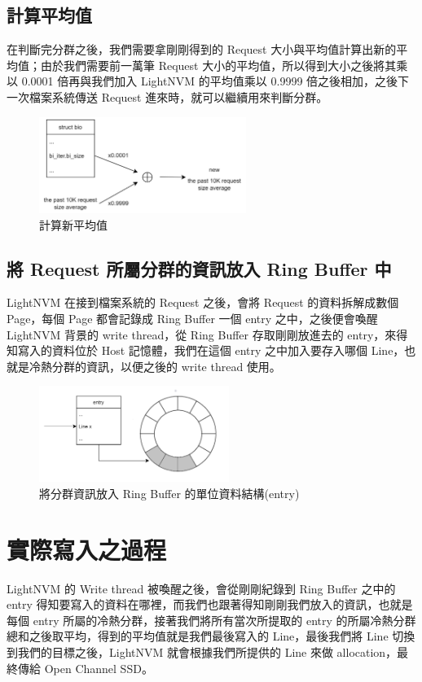 \subsection{計算平均值}\label{s3.2.3}
\indent
在判斷完分群之後，我們需要拿剛剛得到的 Request 大小與平均值計算出新的平均值；由於我們需要前一萬筆 Request 大小的平均值，所以得到大小之後將其乘以 0.0001 倍再與我們加入 LightNVM 的平均值乘以 0.9999 倍之後相加，之後下一次檔案系統傳送 Request 進來時，就可以繼續用來判斷分群。
\begin{figure}[H]
    \centering
    \includegraphics[width=0.6\textwidth]{picture/ch3/new_average.png}
    \caption{計算新平均值}
    \label{f3.4}
\end{figure}

\subsection{將 Request 所屬分群的資訊放入 Ring Buffer 中}\label{s3.2.4}
\indent
LightNVM 在接到檔案系統的 Request 之後，會將 Request 的資料拆解成數個 Page，每個 Page 都會記錄成 Ring Buffer 一個 entry 之中，之後便會喚醒 LightNVM 背景的 write thread，從 Ring Buffer 存取剛剛放進去的 entry，來得知寫入的資料位於 Host 記憶體，我們在這個 entry 之中加入要存入哪個 Line，也就是冷熱分群的資訊，以便之後的 write thread 使用。

\begin{figure}[H]
    \centering
    \includegraphics[width=0.55\textwidth]{picture/ch3/store_line_in_ring_buffer_entry.png}
    \caption{將分群資訊放入 Ring Buffer 的單位資料結構(entry)}
    \label{f3.5}
\end{figure}

\section{實際寫入之過程}\label{s3.3}
\indent
LightNVM 的 Write thread 被喚醒之後，會從剛剛紀錄到 Ring Buffer 之中的 entry 得知要寫入的資料在哪裡，而我們也跟著得知剛剛我們放入的資訊，也就是每個 entry 所屬的冷熱分群，接著我們將所有當次所提取的 entry 的所屬冷熱分群總和之後取平均，得到的平均值就是我們最後寫入的 Line，最後我們將 Line 切換到我們的目標之後，LightNVM 就會根據我們所提供的 Line 來做 allocation，最終傳給 Open Channel SSD。

